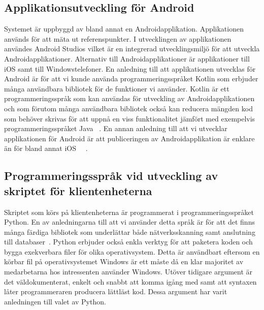 \documentclass[a4paper,12pt]{article}
\begin{document}
 \subsection{Applikationsutveckling för Android}
 Systemet är uppbyggd av bland annat en Androidapplikation. Applikationen används för att mäta ut referenspunkter. I utvecklingen av applikationen användes Android Studios vilket är en integrerad utvecklingsmiljö för att utveckla Androidapplikationer. Alternativ till Androidapplikationer är applikationer till iOS samt till Windowstelefoner. En anledning till att applikationen utvecklas för Android är för att vi kunde använda programmeringsspråket Kotlin som erbjuder många användbara bibliotek för de funktioner vi använder. Kotlin är ett programmeringsspråk som kan användas för utveckling av Androidapplikationen och som
 förutom många användbara bibliotek också kan reducera mängden kod som behöver skrivas för att uppnå en viss funktionalitet jämfört med exempelvis programmeringsspråket Java ~\cite{kotlin}.
 En annan anledning till att vi utvecklar applikationen för Android är att publiceringen av Androidapplikation är enklare än för bland annat iOS ~\cite{submitIphone}~\cite{android}.

 \subsection{Programmeringsspråk vid utveckling av skriptet för klientenheterna}\label{pythonskript}
 Skriptet som körs på klientenheterna är programmerat i programmeringsspråket Python. En av anledningarna till att vi använder detta språk är för att det finns många färdiga bibliotek som underlättar både nätverksskanning samt anslutning till databaser~\cite{python}. Python erbjuder också enkla verktyg för att paketera koden och bygga exekverbara filer för olika operativsystem. Detta är användbart eftersom en körbar fil på operativsystemet Windows är ett måste då en klar majoritet av medarbetarna hos intressenten använder Windows. Utöver tidigare argument är det väldokumenterat, enkelt och snabbt att komma igång med samt att syntaxen låter programmeraren producera lättläst kod. Dessa argument har varit anledningen till valet av Python.
\end{document}
